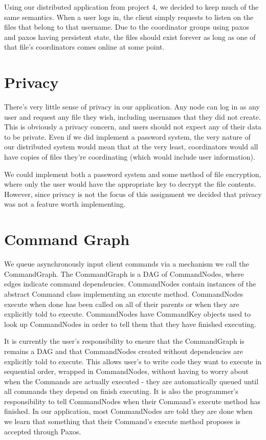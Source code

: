 \documentclass[11pt]{article}
\begin{document}
Using our distributed application from project 4, we decided to keep much of the same semantics. When a user logs in, the client simply requests to listen on the files that belong to that username. Due to the coordinator groups using paxos and paxos having persistent state, the files should exist forever as long as one of that file's coordinators comes online at some point.

\section{Privacy}

There's very little sense of privacy in our application. Any node can log in as any user and request any file they wish, including usernames that they did not create. This is obviously a privacy concern, and users should not expect any of their data to be private. Even if we did implement a password system, the very nature of our distributed system would mean that at the very least, coordinators would all have copies of files they're coordinating (which would include user information). 

We could implement both a password system and some method of file encryption, where only the user would have the appropriate key to decrypt the file contents. However, since privacy is not the focus of this assignment we decided that privacy was not a feature worth implementing. 

\section{Command Graph}

We queue asynchronously input client commands via a mechanism we call the CommandGraph.
The CommandGraph is a DAG of CommandNodes, where edges indicate command dependencies.
CommandNodes contain instances of the abstract Command class implementing an execute method.
CommandNodes execute when done has been called on all of their parents or when they are explicitly told to execute.
CommandNodes have CommandKey objects used to look up CommandNodes in order to tell them that they have finished executing.

It is currently the user's responsibility to ensure that the CommandGraph is remains a DAG and that CommandNodes created without dependencies are
explicitly told to execute. This allows user's to write code they want to execute in sequential order, wrapped in CommandNodes, without having to
worry about when the Commands are actually executed - they are automatically queued until all commands they depend on finish executing.
It is also the programmer's responsibility to tell CommandNodes when their Command's execute method has finished. In our application,
most CommandNodes are told they are done when we learn that something that their Command's execute method proposes is accepted through Paxos.
\end{document}
